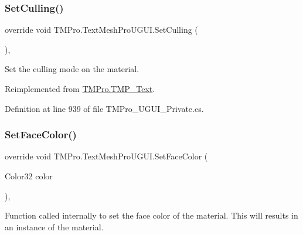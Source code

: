 \mbox{\label{class_t_m_pro_1_1_text_mesh_pro_u_g_u_i_a1042bb0fdc0289c8d159570b9ee3bb5e}} 
\subsubsection{\texorpdfstring{SetCulling()}{SetCulling()}}
{\footnotesize\ttfamily override void T\+M\+Pro.\+Text\+Mesh\+Pro\+U\+G\+U\+I.\+Set\+Culling (\begin{DoxyParamCaption}{ }\end{DoxyParamCaption})\hspace{0.3cm}{\ttfamily [protected]}, {\ttfamily [virtual]}}



Set the culling mode on the material. 



Reimplemented from \mbox{\hyperlink{class_t_m_pro_1_1_t_m_p___text_afd461774563d324758a3d21f5085edf1}{T\+M\+Pro.\+T\+M\+P\+\_\+\+Text}}.



Definition at line 939 of file T\+M\+Pro\+\_\+\+U\+G\+U\+I\+\_\+\+Private.\+cs.

\mbox{\label{class_t_m_pro_1_1_text_mesh_pro_u_g_u_i_ab485c4e2bf309a9485360a19de950fa2}} 
\subsubsection{\texorpdfstring{SetFaceColor()}{SetFaceColor()}}
{\footnotesize\ttfamily override void T\+M\+Pro.\+Text\+Mesh\+Pro\+U\+G\+U\+I.\+Set\+Face\+Color (\begin{DoxyParamCaption}\item[{Color32}]{color }\end{DoxyParamCaption})\hspace{0.3cm}{\ttfamily [protected]}, {\ttfamily [virtual]}}



Function called internally to set the face color of the material. This will results in an instance of the material. 


